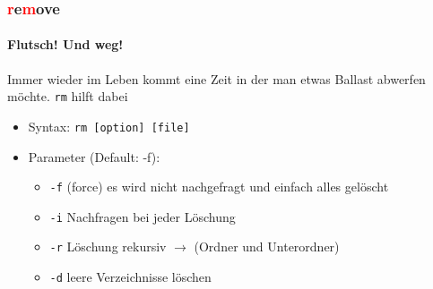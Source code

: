 \documentclass[12pt,utf8]{beamer}
\begin{document}
\begin{frame}
\frametitle{\textcolor{red}{r}e\textcolor{red}{m}ove}
\framesubtitle{\textcolor{ownDarkOr}{Flutsch! Und weg!}}
Immer wieder im Leben kommt eine Zeit in der man etwas Ballast abwerfen möchte.  
\texttt{rm} hilft dabei
\begin{itemize}
	\item Syntax: \texttt{rm [option] [file]}
	\item Parameter (Default: -f):
	\begin{itemize}[<+->]
		\item \texttt{-f} (force) es wird nicht nachgefragt und einfach alles gelöscht
		\item \texttt{-i} Nachfragen bei jeder Löschung
		\item \texttt{-r} Löschung rekursiv $\to$ (Ordner und Unterordner)
		\item \texttt{-d} leere Verzeichnisse löschen
	\end{itemize}
\end{itemize}
\end{frame}

\end{document}

